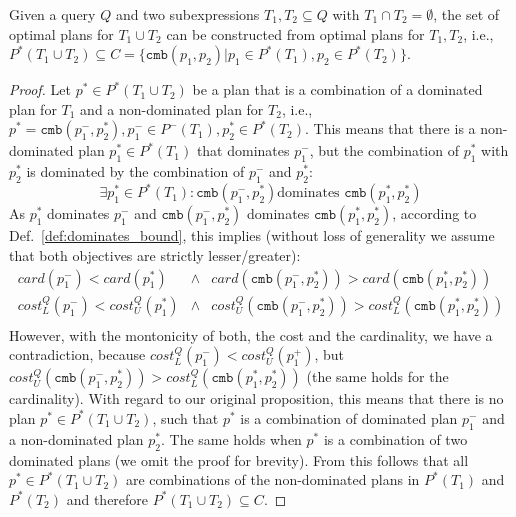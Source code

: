 \begin{theorem}
  Given a query $Q$ and two subexpressions $T_1,T_2 \subseteq Q$ with
  $T_1 \cap T_2 = \emptyset$, the set of optimal plans for $T_1 \cup
  T_2$ can be constructed from optimal plans for $T_1,T_2$, i.e.,
  $P^*(T_1 \cup T_2) \subseteq C =
  \{\mathtt{cmb}(p_1,p_2) | p_1 \in P^*(T_1), p_2 \in P^*(T_2)\}$.
\end{theorem}
\begin{proof}
  Let $p^* \in P^*(T_1 \cup T_2)$ be a plan that is a combination of a
  dominated plan for $T_1$ and a non-dominated plan for $T_2$, i.e.,
  $p^* = \mathtt{cmb}(p^-_1,p^*_2),p^-_1 \in P^-(T_1),p^*_2 \in
  P^*(T_2)$. This means that there is a non-dominated plan $p^*_1 \in
  P^*(T_1)$ that dominates $p^-_1$, but the combination of $p^*_1$
  with $p^*_2$ is dominated by the combination of $p^-_1$ and $p^*_2$:
  \[ \exists p^*_1 \in P^*(T_1) : \mathtt{cmb}(p^-_1,p^*_2) \text{
    dominates } \mathtt{cmb}(p^*_1,p^*_2)\] As $p^*_1$ dominates
  $p^-_1$ and $\mathtt{cmb}(p^-_1,p^*_2)$ dominates
  $\mathtt{cmb}(p^*_1,p^*_2)$, according to
  Def.~\ref{def:dominates_bound}, this implies (without loss of
  generality we assume that both objectives are strictly
  lesser/greater):
  \begin{eqnarray*}
    card(p^-_1) < card(p^*_1) &\wedge& card (\mathtt{cmb}(p^-_1,p^*_2)) > card(\mathtt{cmb}(p^*_1,p^*_2)) \\
    cost^Q_L(p^-_1) < cost^Q_U(p^*_1) &\wedge& cost^Q_U(\mathtt{cmb}(p^-_1,p^*_2)) > cost^Q_L(\mathtt{cmb}(p^*_1,p^*_2))\\
  \end{eqnarray*}
  However, with the montonicity of both, the cost and the cardinality,
  we have a contradiction, because $cost^Q_L(p^-_1) <
  cost^Q_U(p^+_1)$, but $cost^Q_U(\mathtt{cmb}(p^-_1,p^*_2)) >
  cost^Q_L(\mathtt{cmb}(p^*_1,p^*_2))$ (the same holds for the
  cardinality). With regard to our original proposition, this means
  that there is no plan $p^* \in P^*(T_1 \cup T_2)$, such that $p^*$
  is a combination of dominated plan $p^-_1$ and a non-dominated plan
  $p^*_2$. The same holds when $p^*$ is a combination of two dominated
  plans (we omit the proof for brevity). From this follows that all
  $p^* \in P^*(T_1 \cup T_2)$ are combinations of the non-dominated
  plans in $P^*(T_1)$ and $P^*(T_2)$ and therefore $P^*(T_1 \cup T_2)
  \subseteq C$.
\end{proof}


